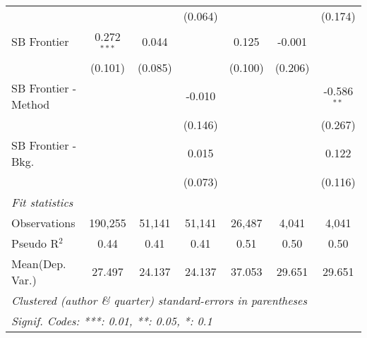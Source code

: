 \begin{tabular}{lcccccc}
                        &               &         & (0.064)      &             &         & (0.174)\\   
   SB Frontier          & 0.272$^{***}$ & 0.044   &              & 0.125       & -0.001  &   \\   
                        & (0.101)       & (0.085) &              & (0.100)     & (0.206) &   \\   
   SB Frontier - Method &               &         & -0.010       &             &         & -0.586$^{**}$\\   
                        &               &         & (0.146)      &             &         & (0.267)\\   
   SB Frontier - Bkg.   &               &         & 0.015        &             &         & 0.122\\   
                        &               &         & (0.073)      &             &         & (0.116)\\   
   \midrule
   \emph{Fit statistics}\\
   Observations         & 190,255       & 51,141  & 51,141       & 26,487      & 4,041   & 4,041\\  
   Pseudo R$^2$         & 0.44          & 0.41    & 0.41         & 0.51        & 0.50    & 0.50\\  
Mean(Dep. Var.) & 27.497 & 24.137 & 24.137 & 37.053 & 29.651 & 29.651 \\
   \midrule \midrule
   \multicolumn{7}{l}{\emph{Clustered (author \& quarter) standard-errors in parentheses}}\\
   \multicolumn{7}{l}{\emph{Signif. Codes: ***: 0.01, **: 0.05, *: 0.1}}\\
\end{tabular}
\par\endgroup
